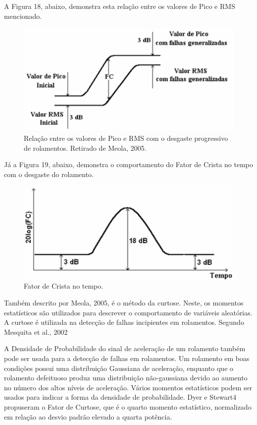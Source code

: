 \documentclass[
	12pt,				
	oneside,			
	a4paper,			
	english,			
	brazil				
	]{abntex2ppgsi}
\begin{document}
A Figura 18, abaixo, demonstra esta relação entre os valores de Pico e RMS mencionado.  

\begin{figure}[!htb]
\centering
\includegraphics{Figura18}
\caption {Relação entre os valores de Pico e RMS com o desgaste progressivo de rolamentos. Retirado de Meola, 2005.}
\label{Figura18}
\end{figure}	

Já a Figura 19, abaixo, demonstra o comportamento do Fator de Crista no tempo com o desgaste do rolamento.

\begin{figure}[!htb]
\centering
\includegraphics{Figura19}
\caption {Fator de Crista no tempo.}
\label{Figura19}
\end{figure}	

Também descrito por Meola, 2005, é o método da curtose. Neste, os momentos estatísticos são utilizados para descrever o comportamento de variáveis aleatórias. A curtose é utilizada na detecção de falhas incipientes em rolamentos. Segundo Mesquita et al., 2002

\begin{citacao}
A Densidade de Probabilidade do sinal de aceleração de um rolamento também pode ser usada para a detecção de falhas em rolamentos. Um rolamento em boas condições possui uma distribuição Gaussiana de aceleração, enquanto que o rolamento defeituoso produz uma distribuição não-gaussiana devido ao aumento no número dos altos níveis de aceleração.
Vários momentos estatísticos podem ser usados para indicar a forma da densidade de probabilidade. Dyer e Stewart4 propuseram o Fator de Curtose, que é o quarto momento estatístico, normalizado em relação ao desvio padrão elevado a quarta potência.
\end{citacao}
\end{document}
